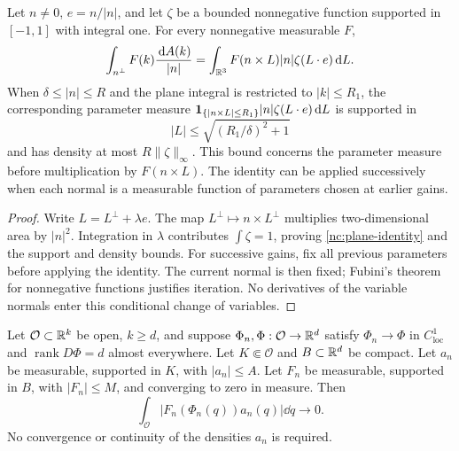 \begin{lemma}
\label{nc:plane-parameters}
Let \(n\ne0\), \(e=n/|n|\), and let \(\zeta\) be a bounded
nonnegative function supported in \([-1,1]\) with integral one.
For every nonnegative measurable \(F\),
\begin{equation}
\label{nc:plane-identity}
 \int_{n^\perp} F(k)\frac{\,\mathrm d A(k)}{|n|}
 =
 \int_{\mathbb R^3}F(n\times L)|n|\zeta(L\cdot e)\,\mathrm d L .
\end{equation}
When \(\delta\le|n|\le R\) and the plane integral is restricted
to \(|k|\le R_1\), the corresponding parameter measure
\(\mathbf 1_{\{|n\times L|\le R_1\}}|n|\zeta(L\cdot e)\,\mathrm d L\)
is supported in
\[
 |L|\le\sqrt{(R_1/\delta)^2+1}
\]
and has density at most \(R\|\zeta\|_\infty\). This bound concerns
the parameter measure before multiplication by \(F(n\times L)\).
The identity can be applied successively when each normal is a
measurable function of parameters chosen at earlier gains.
\end{lemma}

\begin{proof}
Write \(L=L^\perp+\lambda e\).  The map
\(L^\perp\mapsto n\times L^\perp\) multiplies two-dimensional
area by \(|n|^2\).  Integration in \(\lambda\) contributes
\(\int\zeta=1\), proving \eqref{nc:plane-identity} and the support
and density bounds.  For successive gains, fix all previous
parameters before applying the identity.  The current normal is
then fixed; Fubini's theorem for nonnegative functions justifies
iteration.  No derivatives of the variable normals enter this
conditional change of variables.
\end{proof}

\begin{lemma}
\label{nc:uniform-pullback}
Let \(\mathcal O\subset\mathbb R^k\) be open, \(k\ge d\), and suppose
\(\Phi_n,\Phi:\mathcal O\to\mathbb R^d\) satisfy
\(\Phi_n\to\Phi\) in \(C^1_{\mathrm{loc}}\) and
\(\operatorname{rank}D\Phi=d\) almost everywhere.
Let \(K\Subset\mathcal O\) and \(B\subset\mathbb R^d\) be compact.
Let \(a_n\) be measurable, supported in \(K\), with
\(|a_n|\le A\).  Let \(F_n\) be measurable, supported in \(B\),
with \(|F_n|\le M\), and converging to zero in measure.  Then
\begin{equation}
\label{nc:pullback-conclusion}
 \int_{\mathcal O}|F_n(\Phi_n(q))a_n(q)|\dd q\longrightarrow0 .
\end{equation}
No convergence or continuity of the densities \(a_n\) is required.
\end{lemma}

